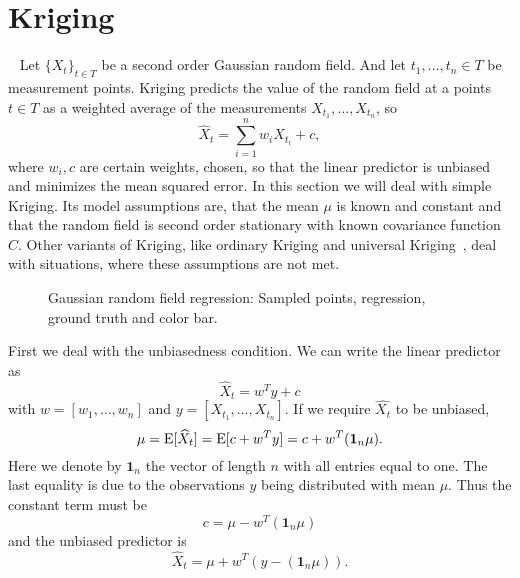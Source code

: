\section{Kriging}~\label{sec:kriging}
% 
% 
% 
Let \( \{ X_{t} \}_{t \in T} \) be a second order Gaussian random field.
And let \( t_{1}, \dots, t_{n} \in T \) be measurement points. 
Kriging predicts the value of the random field at a points \( t \in T \) as a weighted average of the measurements \( X_{t_{1}}, \dots, X_{t_{n}} \), so
\[
    \hat{X}_{t} = \sum_{i=1}^{n} w_{i} X_{t_{i}}+c,
\]
where \( w_{i} ,c\) are certain weights, chosen, so that the linear predictor is unbiased and minimizes the mean squared error.
In this section we will deal with simple Kriging. Its model assumptions are, that the mean $\mu$ is known and constant and that the random field is second order stationary with known covariance function \( C \).
Other variants of Kriging, like ordinary Kriging and universal Kriging~\cite{cressie1993statistics}, deal with situations, where these assumptions are not met.
\begin{figure}[b]
    \centering
    
    \caption{Gaussian random field regression: Sampled points, regression, ground truth and color bar.}
    \label{fig:random_field_regression}
\end{figure}

First we deal with the unbiasedness condition.
We can write the linear predictor as
\[
    \hat{X}_{t} = w^{T} y + c
\]
with \( w = [w_{1}, \dots, w_{n}] \) and \( y = [X_{t_{1}}, \dots, X_{t_{n}}] \).
If we require \( \hat{X_{t}} \) to be unbiased,
\[
    \mu = \operatorname*{E}[\widehat{X}_{t}] = \operatorname*{E}[c + w^{T} y] = c + w^{T} (\mathbf{1}_{n} \mu).
\]
Here we denote by \( \mathbf{1}_{n} \) the vector of length \( n \) with all entries equal to one.
The last equality is due to the observations $y$ being distributed with mean $\mu$.
Thus the constant term must be
\[
    c = \mu - w^{T} (\mathbf{1}_{n} \mu)
\]
and the unbiased predictor is
\[
    \hat{X}_{t} = \mu + w^{T} (y- (\mathbf{1}_{n} \mu)).
\]

